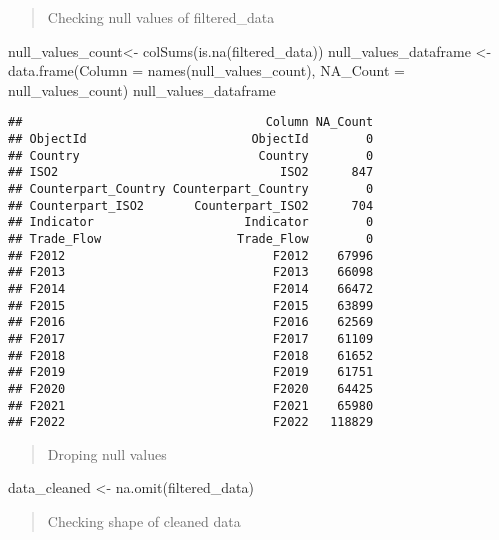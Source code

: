 \documentclass[
]{article}
\newenvironment{Shaded}{\begin{snugshade}}{\end{snugshade}}
\newcommand{\AttributeTok}[1]{\textcolor[rgb]{0.77,0.63,0.00}{#1}}
\newcommand{\FunctionTok}[1]{\textcolor[rgb]{0.00,0.00,0.00}{#1}}
\newcommand{\NormalTok}[1]{#1}
\newcommand{\OtherTok}[1]{\textcolor[rgb]{0.56,0.35,0.01}{#1}}
\begin{document}
\begin{quote}
Checking null values of filtered\_data
\end{quote}

\begin{Shaded}
\begin{Highlighting}[]
\NormalTok{null\_values\_count}\OtherTok{\textless{}{-}} \FunctionTok{colSums}\NormalTok{(}\FunctionTok{is.na}\NormalTok{(filtered\_data))}
\NormalTok{null\_values\_dataframe }\OtherTok{\textless{}{-}} \FunctionTok{data.frame}\NormalTok{(}\AttributeTok{Column =} \FunctionTok{names}\NormalTok{(null\_values\_count), }\AttributeTok{NA\_Count =}\NormalTok{ null\_values\_count)}
\NormalTok{null\_values\_dataframe}
\end{Highlighting}
\end{Shaded}

\begin{verbatim}
##                                  Column NA_Count
## ObjectId                       ObjectId        0
## Country                         Country        0
## ISO2                               ISO2      847
## Counterpart_Country Counterpart_Country        0
## Counterpart_ISO2       Counterpart_ISO2      704
## Indicator                     Indicator        0
## Trade_Flow                   Trade_Flow        0
## F2012                             F2012    67996
## F2013                             F2013    66098
## F2014                             F2014    66472
## F2015                             F2015    63899
## F2016                             F2016    62569
## F2017                             F2017    61109
## F2018                             F2018    61652
## F2019                             F2019    61751
## F2020                             F2020    64425
## F2021                             F2021    65980
## F2022                             F2022   118829
\end{verbatim}

\begin{quote}
Droping null values
\end{quote}

\begin{Shaded}
\begin{Highlighting}[]
\NormalTok{data\_cleaned }\OtherTok{\textless{}{-}} \FunctionTok{na.omit}\NormalTok{(filtered\_data)}
\end{Highlighting}
\end{Shaded}

\begin{quote}
Checking shape of cleaned data
\end{quote}
\end{document}
